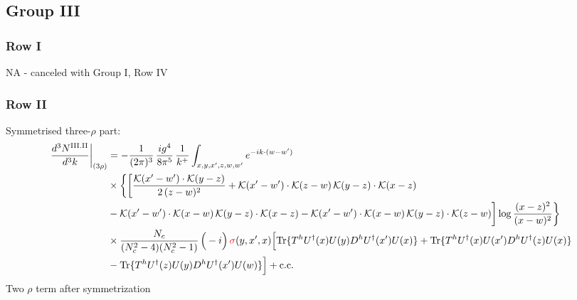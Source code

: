\documentclass[9pt]{article}
\numberwithin{equation}{section}
\begin{document}
\subsection{Group III}
\subsubsection*{Row I}
\textsc{NA} - canceled with Group I, Row IV
\subsubsection*{Row II}
Symmetrised three-$\rho$ part:
\begin{align}
\frac{d^{3}N^{\rm III.II}}{d^{3}k}\bigg|_{(3\rho)}&=-\frac{1}{(2\pi)^{3}}\,\frac{ig^{4}}{8\pi^{5}}\,\frac{1}{k^{+}}\int_{x,y,x',z,w,w'}e^{-ik\cdot(w-w')}\notag\\
&\times\bigg\{\bigg[\frac{\mathcal{K}(x'-w')\cdot\mathcal{K}(y-z)}{2\,(z-w)^{2}}+\mathcal{K}(x'-w')\cdot\mathcal{K}(z-w)\,\mathcal{K}(y-z)\cdot\mathcal{K}(x-z)\notag\\
&-\mathcal{K}(x'-w')\cdot\mathcal{K}(x-w)\,\mathcal{K}(y-z)\cdot\mathcal{K}(x-z)-\mathcal{K}(x'-w')\cdot\mathcal{K}(x-w)\,\mathcal{K}(y-z)\cdot\mathcal{K}(z-w)\bigg]\log\frac{(x-z)^{2}}{(x-w)^{2}}\bigg\}\notag\\
&\times \frac{N_{c}}{(N_{c}^{2}-4)(N_{c}^{2}-1)}\,\Big(-i\Big)\,{\color{red}\sigma}(y,x',x)\Big[{\rm Tr}\{T^{h}U^{\dagger}(x)U(y)D^{h}U^{\dagger}(x')U(x)\}+{\rm Tr}\{T^{h}U^{\dagger}(x)U(x')D^{h}U^{\dagger}(z)U(x)\}\notag\\
& -{\rm Tr}\{T^{h}U^{\dagger}(z)U(y)D^{h}U^{\dagger}(x')U(w)\}\Big]+{\rm c.c.}\label{eq:E-III.II-3}
\end{align}
Two $\rho$ term after symmetrization
\end{document}

